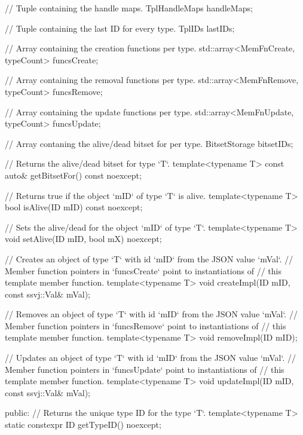 \documentclass{report}
\begin{document}
{            // Tuple containing the handle maps.
            TplHandleMaps handleMaps;

            // Tuple containing the last ID for every type.
            TplIDs lastIDs;

            // Array containing the creation functions per type.
            std::array<MemFnCreate, typeCount> funcsCreate;

            // Array containing the removal functions per type.
            std::array<MemFnRemove, typeCount> funcsRemove;

            // Array containing the update functions per type.
            std::array<MemFnUpdate, typeCount> funcsUpdate;

            // Array contaning the alive/dead bitset for per type.
            BitsetStorage bitsetIDs;

            // Returns the alive/dead bitset for type `T`.
            template<typename T> const auto& getBitsetFor() const noexcept;

            // Returns true if the object `mID` of type `T` is alive.
            template<typename T> bool isAlive(ID mID) const noexcept;

            // Sets the alive/dead for the object `mID` of type `T`.
            template<typename T> void setAlive(ID mID, bool mX) noexcept;

            // Creates an object of type `T` with id `mID` from the JSON value `mVal`.
            // Member function pointers in `funcsCreate` point to instantiations of
            // this template member function.
            template<typename T> void createImpl(ID mID, const ssvj::Val& mVal);

            // Removes an object of type `T` with id `mID` from the JSON value `mVal`.
            // Member function pointers in `funcsRemove` point to instantiations of
            // this template member function.
            template<typename T> void removeImpl(ID mID);
            
            // Updates an object of type `T` with id `mID` from the JSON value `mVal`.
            // Member function pointers in `funcsUpdate` point to instantiations of
            // this template member function.
            template<typename T> void updateImpl(ID mID, const ssvj::Val& mVal);

        public:
            // Returns the unique type ID for the type `T`.
            template<typename T> static constexpr ID getTypeID() noexcept;

}
\end{document}
